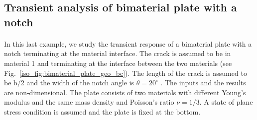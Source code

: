 \subsection{Transient analysis of bimaterial plate with a notch}

\paragraph{}
In this last example, we study the transient response of a bimaterial plate with a notch terminating at the material interface.
The crack is assumed to be in material 1 and terminating at the interface between the two materials (see Fig.~\ref{iso_fig:bimaterial_plate_geo_bc}).
The length of the crack is assumed to be b/2 and the width of the notch angle is $\theta = 20^\circ$ .
The inputs and the results are non-dimensional.
The plate consists of two materials with different Young's modulus and the same mass density and Poisson's ratio $\nu = 1/3$.
A state of plane stress condition is assumed and the plate is fixed at the bottom.
